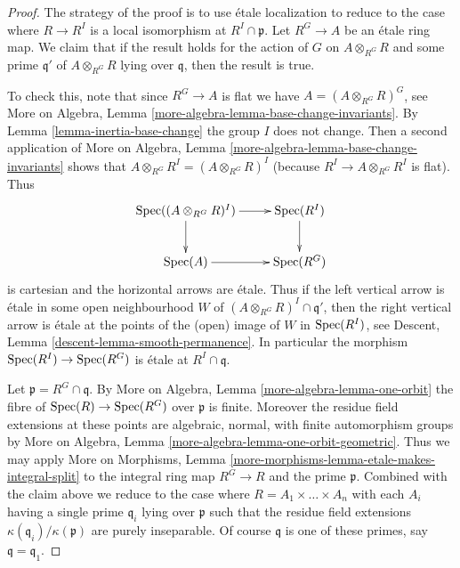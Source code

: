 \begin{proof}
The strategy of the proof is to use \'etale localization to
reduce to the case where $R \to R^I$ is a local isomorphism at
$R^I \cap \mathfrak p$.
Let $R^G \to A$ be an \'etale ring map. We claim that if the result
holds for the action of $G$ on $A \otimes_{R^G} R$ and some prime
$\mathfrak q'$ of $A \otimes_{R^G} R$ lying over $\mathfrak q$, then
the result is true.

\medskip\noindent
To check this, note that since $R^G \to A$ is flat we have
$A = (A \otimes_{R^G} R)^G$, see More on Algebra,
Lemma \ref{more-algebra-lemma-base-change-invariants}.
By Lemma \ref{lemma-inertia-base-change} the group $I$ does not change.
Then a second application of More on Algebra,
Lemma \ref{more-algebra-lemma-base-change-invariants}
shows that $A \otimes_{R^G} R^I = (A \otimes_{R^G} R)^I$
(because $R^I \to A \otimes_{R^G} R^I$ is flat).
Thus
$$
\xymatrix{
\Spec((A \otimes_{R^G} R)^I) \ar[d] \ar[r] & \Spec(R^I) \ar[d] \\
\Spec(A) \ar[r] & \Spec(R^G)
}
$$
is cartesian and the horizontal arrows are \'etale. Thus if the
left vertical arrow is \'etale in some open neighbourhood $W$ of
$(A \otimes_{R^G} R)^I \cap \mathfrak q'$, then the right vertical
arrow is \'etale at the points of the (open) image of $W$ in
$\mathop{\mathrm{Spec}}(R^I)$, see
Descent, Lemma \ref{descent-lemma-smooth-permanence}. In particular
the morphism $\mathop{\mathrm{Spec}}(R^I) \to \mathop{\mathrm{Spec}}(R^G)$ is \'etale at $R^I \cap \mathfrak q$.

\medskip\noindent
Let $\mathfrak p = R^G \cap \mathfrak q$.
By More on Algebra, Lemma \ref{more-algebra-lemma-one-orbit}
the fibre of $\mathop{\mathrm{Spec}}(R) \to \mathop{\mathrm{Spec}}(R^G)$ over $\mathfrak p$ is
finite. Moreover the residue field extensions at these points
are algebraic, normal, with finite automorphism groups by
More on Algebra, Lemma \ref{more-algebra-lemma-one-orbit-geometric}.
Thus we may apply
More on Morphisms,
Lemma \ref{more-morphisms-lemma-etale-makes-integral-split}
to the integral ring map $R^G \to R$ and the prime $\mathfrak p$.
Combined with the claim above we reduce to the case where
$R = A_1 \times \ldots \times A_n$ with each $A_i$ having a single
prime $\mathfrak q_i$ lying over $\mathfrak p$ such that the
residue field extensions $\kappa(\mathfrak q_i)/\kappa(\mathfrak p)$
are purely inseparable. Of course $\mathfrak q$ is one of
these primes, say $\mathfrak q = \mathfrak q_1$.


\end{proof}
